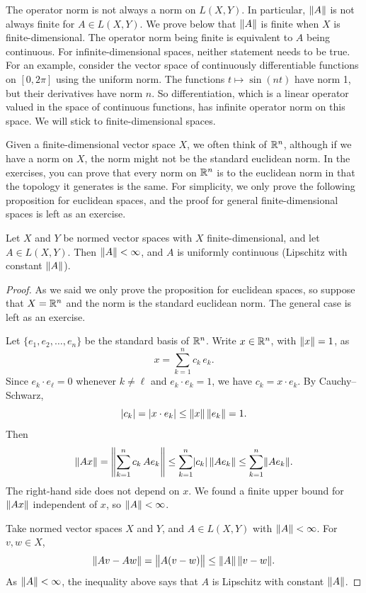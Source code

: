 The operator norm is not always a norm on $L(X,Y)$.
In particular,
$\lVert {A} \rVert$ is not always finite for $A \in L(X,Y)$.
We prove below that $\lVert {A} \rVert$ is finite when $X$ is finite-dimensional.
The operator norm being finite is equivalent to $A$ being continuous.
For infinite-dimensional spaces, neither statement needs to be true.
For an example,
consider the vector space of continuously differentiable functions on
$[0,2\pi]$ using the uniform norm.  The functions
$t \mapsto \sin(n t)$ have norm 1, but their derivatives have norm $n$.  So
differentiation, which is a linear operator valued in the space of
continuous functions, has infinite operator norm on this space.
We will stick to finite-dimensional spaces.

Given a finite-dimensional vector space $X$, we often think of
${\mathbb{R}}^n$, although if we have a norm on $X$, the norm might not be
the standard euclidean norm.  In the exercises, you can prove that
every norm on ${\mathbb{R}}^n$ is  to the euclidean norm in that the
topology it generates is the same.  For simplicity, we only prove the
following proposition for euclidean spaces, and the proof for general
finite-dimensional spaces is left as an exercise.

\begin{prop} \label{prop:finitedimpropnormfin}
Let $X$ and $Y$ be normed vector spaces with
$X$ finite-dimensional, and let
$A \in L(X,Y)$.
Then $\lVert {A} \rVert < \infty$, and
$A$ is uniformly continuous (Lipschitz with constant $\lVert {A} \rVert$).
\end{prop}

\begin{proof}
As we said we only prove the proposition for euclidean spaces, so suppose
that $X = {\mathbb{R}}^n$ and the norm is the standard euclidean norm.
The general case is left as an exercise.

Let $\{ e_1,e_2,\ldots,e_n \}$ be the standard basis of ${\mathbb{R}}^n$.
Write $x \in {\mathbb{R}}^n$, with $\lVert {x} \rVert = 1$, as
\begin{equation*}
x = \sum_{k=1}^n c_k \, e_k .
\end{equation*}
Since $e_k \cdot e_\ell = 0$ whenever $k \neq \ell$ and $e_k \cdot e_k = 1$,
we have $c_k = x \cdot e_k$.  By Cauchy--Schwarz,
\begin{equation*}
\lvert {c_k} \rvert = \lvert { x \cdot e_k } \rvert
\leq \lVert {x} \rVert \, \lVert {e_k} \rVert = 1 .
\end{equation*}
Then
\begin{equation*}
\lVert {Ax} \rVert =
\left\lVert {\sum_{k=1}^n c_k \, Ae_k} \right\rVert
\leq
\sum_{k=1}^n \lvert {c_k} \rvert \, \lVert {Ae_k} \rVert 
\leq
\sum_{k=1}^n \lVert {Ae_k} \rVert .
\end{equation*}
The right-hand side does not depend on $x$.  We found
a finite upper bound for $\lVert {Ax} \rVert$ independent of $x$, so $\lVert {A} \rVert < \infty$.

Take normed vector spaces $X$ and $Y$, and $A \in L(X,Y)$ with
$\lVert {A} \rVert < \infty$.
For $v,w \in X$,
\begin{equation*}
\lVert {Av - Aw} \rVert =
\bigl\lVert {A(v-w)} \bigr\rVert \leq \lVert {A} \rVert \, \lVert {v-w} \rVert .
\end{equation*}
As $\lVert {A} \rVert < \infty$, the inequality above says that
$A$ is Lipschitz with constant $\lVert {A} \rVert$.
\end{proof}

